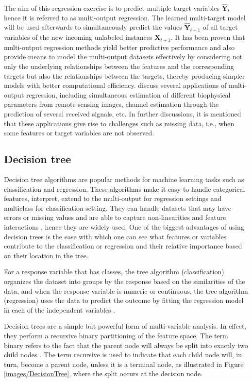 The aim of this regression exercise is to predict multiple target variables $\widehat{\textbf{Y}}_{t}$  hence it is referred to as multi-output regression. The learned multi-target model will be used afterwards to simultaneously predict the values $\widehat{\textbf{Y}}_{t+1}$  of all target variables of the new incoming unlabeled instances $\textbf{X}_{t+1}$. It has been proven that multi-output regression methods yield better predictive performance and also provide means to
model the multi-output datasets effectively by considering not only the underlying relationships
between the features and the corresponding targets but also the relationships between
the targets, thereby producing simpler models with better computational efficiency. \citep{borchani2015survey} discuss several applications of multi-output regression, including simultaneous estimation of different biophysical parameters from remote sensing images, channel estimation through the prediction of several received signals, etc. In further discussions, it is mentioned that these applications give rise to challenges such as missing data, i.e., when some features or target variables are not observed.

\subsection{Decision tree}
\label{Dt}
Decision tree algorithms are popular methods for machine learning tasks such as classification and regression. These algorithms make it easy to handle categorical features, interpret, extend to the multi-output for regression settings and multiclass for classification setting. They can handle datasets that may have errors or missing values and are able to capture non-linearities and feature interactions \citep{DT}, hence they are widely used. One of the biggest advantages of using decision trees is the ease with which one can see what features or variables contribute to the classification or regression and their relative importance based on their location in the tree.

For a response variable that
has classes, the tree algorithm (classification) organizes the dataset into groups by the response based on the similarities of the data, and when the response variable is numeric or continuous, the tree algorithm (regression) uses the data to predict the outcome by fitting the regression model in each of the independent variables \citep{morgan2014classification}.

Decision trees are a simple but powerful form of multi-variable analysis. In effect, they  perform a recursive binary partitioning of the feature space. The term binary refers to the fact that the parent node  will always be split into exactly two child nodes \citep{moisen2008classification}. The term recursive is used to indicate that each child node will, in turn, become a parent node, unless it is a terminal node, as illustrated in Figure \ref{images/DecisionTree}, where the split occurs at the decision node.  


